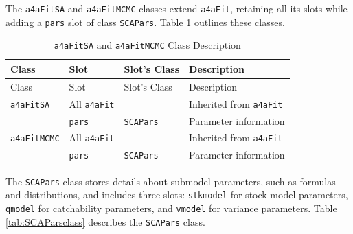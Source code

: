 \documentclass[
]{book}
\begin{document}
The \texttt{a4aFitSA} and \texttt{a4aFitMCMC} classes extend \texttt{a4aFit}, retaining all its slots while adding a \texttt{pars} slot of class \texttt{SCAPars}. Table \ref{tab:a4afitSAclass} outlines these classes.

\begin{longtable}[]{@{}llll@{}}
\caption{\label{tab:a4afitSAclass} \texttt{a4aFitSA} and \texttt{a4aFitMCMC} Class Description}\tabularnewline
\toprule\noalign{}
Class & Slot & Slot's Class & Description \\
\midrule\noalign{}
\endfirsthead
\toprule\noalign{}
Class & Slot & Slot's Class & Description \\
\midrule\noalign{}
\endhead
\bottomrule\noalign{}
\endlastfoot
\texttt{a4aFitSA} & All \texttt{a4aFit} & & Inherited from \texttt{a4aFit} \\
& \texttt{pars} & \texttt{SCAPars} & Parameter information \\
\texttt{a4aFitMCMC} & All \texttt{a4aFit} & & Inherited from \texttt{a4aFit} \\
& \texttt{pars} & \texttt{SCAPars} & Parameter information \\
\end{longtable}

The \texttt{SCAPars} class stores details about submodel parameters, such as formulas and distributions, and includes three slots: \texttt{stkmodel} for stock model parameters, \texttt{qmodel} for catchability parameters, and \texttt{vmodel} for variance parameters. Table \ref{tab:SCAParsclass} describes the \texttt{SCAPars} class.
\end{document}
